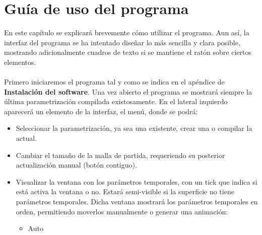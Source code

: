 
\chapter{Guía de uso del programa}\label{ap:apendice2}

En este capítulo se explicará brevemente cómo utilizar el programa. Aun así, la interfaz del programa se ha intentado diseñar lo más sencilla y clara posible, mostrando adicionalmente cuadros de texto si se mantiene el ratón sobre ciertos elementos.\\
\\Primero iniciaremos el programa tal y como se indica en el apéndice de \textbf{Instalación del software}. Una vez abierto el programa se mostrará siempre la última parametrización compilada existosamente. En el lateral izquierdo aparecerá un elemento de la interfaz, el menú, donde se podrá:
\begin{itemize}
	\item Seleccionar la parametrización, ya sea una existente, crear una o compilar la actual.
	\item Cambiar el tamaño de la malla de partida, requeriendo su posterior actualización manual (botón contiguo).
	\item Visualizar la ventana con los parámetros temporales, con un tick que indica si está activa la ventana o no. Estará semi-visible si la superficie no tiene parámetros temporales. Dicha ventana mostrará los parámetros temporales en orden, permitiendo moverlos manualmente o generar una animación:
	\begin{itemize}
		\item Auto
	\end{itemize}
\end{itemize}

\endinput
